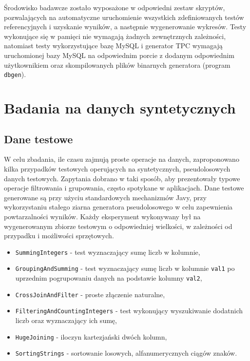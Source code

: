 \documentclass[12pt]{extarticle}
\begin{document}
    Środowisko badawcze zostało wyposażone w odpowiedni zestaw skryptów, pozwalających na automatyczne uruchomienie wszystkich zdefiniowanych testów referencyjnych i uzyskanie wyników, a następnie wygenerowanie wykresów. Testy wykonujące się w pamięci nie wymagają żadnych zewnętrznych zależności, natomiast testy wykorzystujące bazę MySQL i generator TPC wymagają uruchomionej bazy MySQL na odpowiednim porcie z dodanym odpowiednim użytkownikiem oraz skompilowanych plików binarnych generatora (program \texttt{dbgen}).


\section{Badania na danych syntetycznych}

\subsection{Dane testowe}

    W celu zbadania, ile czasu zajmują proste operacje na danych, zaproponowano kilka przypadków testowych operujących na syntetycznych, pseudolosowych danych testowych. Zapytania dobrano w taki sposób, aby prezentowały typowe operacje filtrowania i grupowania, często spotykane w aplikacjach. Dane testowe generowane są przy użyciu standardowych mechanizmów Javy, przy wykorzystaniu stałego ziarna generatora pseudolosowego w celu zapewnienia powtarzalności wyników. Każdy eksperyment wykonywany był na wygenerowanym zbiorze testowym o odpowiedniej wielkości, w zależności od przypadku i możliwości sprzętowych.

\begin{itemize}
    \item \texttt{SummingIntegers} - test wyznaczający sumę liczb w kolumnie,
    \item \texttt{GroupingAndSumming} - test wyznaczający sumę liczb w kolumnie \texttt{val1} po uprzednim pogrupowaniu danych na podstawie kolumny \texttt{val2},
    \item \texttt{CrossJoinAndFilter} - proste złączenie naturalne,
    \item \texttt{FilteringAndCountingIntegers} - test wykonujący wyszukiwanie dodatnich liczb oraz wyznaczający ich sumę,
    \item \texttt{HugeJoining} - iloczyn kartezjański dwóch kolumn,
    \item \texttt{SortingStrings} - sortowanie losowych, alfanumerycznych ciągów znaków.
\end{itemize}
\end{document}

